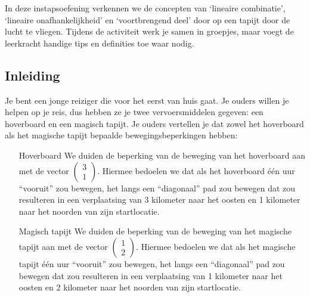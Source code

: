 \documentclass{ximera}
\begin{document}
\author{Alexander Holvoet}

In deze instapsoefening verkennen we de concepten van `lineaire combinatie', `lineaire onafhankelijkheid' en `voortbrengend deel' door op een tapijt door de lucht te vliegen.
Tijdens de activiteit werk je samen in groepjes, maar voegt de leerkracht handige tips en definities toe waar nodig.\newline

\subsection*{Inleiding}
Je bent een jonge reiziger die voor het eerst van huis gaat.
Je ouders willen je helpen op je reis, dus hebben ze je twee vervoersmiddelen gegeven: een hoverboard en een magisch tapijt.
Je ouders vertellen je dat zowel het hoverboard als het magische tapijt bepaalde bewegingsbeperkingen hebben:
\begin{itemize}
    \item[Hoverboard] We duiden de beperking van de beweging van het hoverboard aan met de vector $\begin{pmatrix} 3\\ 1\end{pmatrix}$.
    Hiermee bedoelen we dat als het hoverboard één uur ``vooruit'' zou bewegen, het langs een ``diagonaal'' pad zou bewegen dat zou resulteren in een verplaatsing van 3 kilometer naar het oosten en 1 kilometer naar het noorden van zijn startlocatie.
    \item[Magisch tapijt] We duiden de beperking van de beweging van het magische tapijt aan met de vector $\begin{pmatrix} 1 \\ 2 \end{pmatrix}$.
    Hiermee bedoelen we dat als het magische tapijt één uur ``vooruit'' zou bewegen, het langs een ``diagonaal'' pad zou bewegen dat zou resulteren in een verplaatsing van 1 kilometer naar het oosten en 2 kilometer naar het noorden van zijn startlocatie.
\end{itemize}
\end{document}
